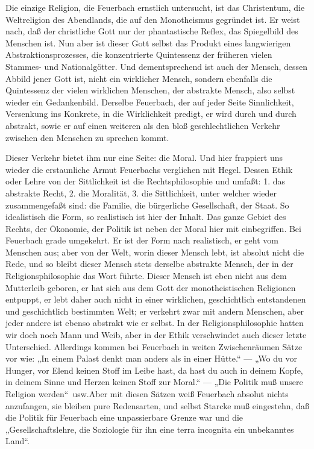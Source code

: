 Die einzige Religion, die Feuerbach ernstlich untersucht, ist
das Christentum, die Weltreligion des Abendlands, die auf den
Monotheismus gegründet ist. Er weist nach, daß der christliche Gott nur
der phantastische Reflex, das Spiegelbild des Menschen ist. Nun aber ist
dieser Gott selbst das Produkt eines langwierigen Abstraktionsprozesses,
die konzentrierte Quintessenz der früheren vielen Stammes- und
Nationalgötter. Und dementsprechend ist auch der Mensch, dessen Abbild
jener Gott ist, nicht ein wirklicher Mensch, sondern ebenfalls die
Quintessenz der vielen wirklichen Menschen, der abstrakte Mensch, also
selbst wieder ein Gedankenbild. Derselbe Feuerbach, der auf jeder Seite
Sinnlichkeit, Versenkung ins Konkrete, in die Wirklichkeit predigt, er
wird durch und durch abstrakt, sowie er auf einen weiteren als den bloß
geschlechtlichen Verkehr zwischen den Menschen zu sprechen kommt.

Dieser Verkehr bietet ihm nur eine Seite: die Moral. Und hier
frappiert uns wieder die erstaunliche Armut Feuerbachs verglichen mit
Hegel. Dessen Ethik oder Lehre von der Sittlichkeit ist die
Rechtsphilosophie und umfaßt: 1. das abstrakte Recht, 2. die Moralität,
3. die Sittlichkeit, unter welcher wieder zusammengefaßt sind: die
Familie, die bürgerliche Gesellschaft, der Staat. So idealistisch die
Form, so realistisch ist hier der Inhalt. Das ganze Gebiet des Rechts,
der Ökonomie, der Politik ist neben der Moral hier mit einbegriffen. Bei
Feuerbach grade umgekehrt. Er ist der Form nach realistisch, er geht vom
Menschen aus; aber von der Welt, worin dieser Mensch lebt, ist absolut
nicht die Rede, und so bleibt dieser Mensch stets derselbe abstrakte
Mensch, der in der Religionsphilosophie das Wort führte. Dieser Mensch
ist eben nicht aus dem Mutterleib geboren, er hat sich aus dem Gott der
monotheistischen Religionen entpuppt, er lebt daher auch nicht in einer
wirklichen, geschichtlich entstandenen und geschichtlich bestimmten
Welt; er verkehrt zwar mit andern Menschen, aber jeder andere ist ebenso
abstrakt wie er selbst. In der Religionsphilosophie hatten wir doch noch
Mann und Weib, aber in der Ethik verschwindet auch dieser letzte
Unterschied. Allerdings kommen bei Feuerbach in weiten Zwischenräumen
Sätze vor wie: „In einem Palast denkt man anders als in einer Hütte.`` ---
„Wo du vor Hunger, vor Elend keinen Stoff im Leibe hast, da hast du auch
in deinem Kopfe, in deinem Sinne und Herzen keinen Stoff zur Moral.`` ---
„Die Politik muß unsere Religion werden``\est\ usw.Aber mit diesen Sätzen weiß
Feuerbach absolut nichts anzufangen, sie bleiben pure Redensarten, und
selbst Starcke muß eingestehn, daß die Politik für Feuerbach eine
unpassierbare Grenze war und die „Gesellschaftslehre, die Soziologie für
ihn eine terra incognita \textbar{}ein unbekanntes Land\textbar{}``.

